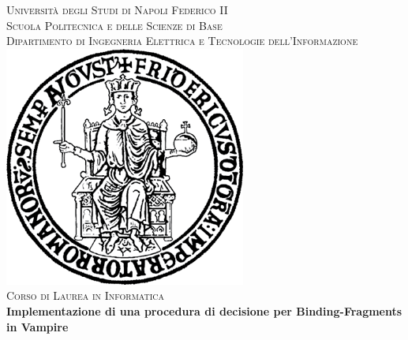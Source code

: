 \documentclass[./main.tex]{subfiles}
\begin{document}

\pagestyle{empty}

\begin{center}

{\fontsize{0.7cm}{1em}\selectfont \textsc{Università degli Studi di Napoli Federico II}}\\[5pt]
{\fontsize{0.6cm}{1em}\selectfont \textsc{Scuola Politecnica e delle Scienze di Base}}\\[5pt]
{\fontsize{0.45cm}{1em}\selectfont \textsc{ Dipartimento di Ingegneria Elettrica e Tecnologie dell'Informazione}}\\[0.5cm]
\vspace{1cm}
\includegraphics[scale=0.7]{images/logo.png}\\[10pt] 
{\fontsize{0.6cm}{1em}\selectfont \textsc{Corso di Laurea in Informatica}}\\[1cm]

{\huge \textbf{Implementazione di una procedura di decisione per Binding-Fragments in Vampire}\\[0.5cm]}

\vfill



\end{center}
\end{document}
